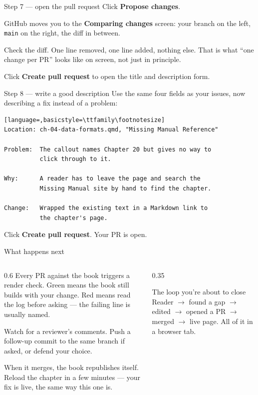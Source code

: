 \documentclass[9pt,aspectratio=169]{beamer}
\begin{document}
\begin{frame}{Step 7 --- open the pull request}
    Click \textbf{Propose changes}.

    \medskip
    GitHub moves you to the \textbf{Comparing changes} screen: your branch on the left, \texttt{main} on the right, the diff in between.

    \medskip
    Check the diff. One line removed, one line added, nothing else. That is what ``one change per PR'' looks like on screen, not just in principle.

    \medskip
    Click \textbf{Create pull request} to open the title and description form.
\end{frame}

\begin{frame}[fragile]{Step 8 --- write a good description}
    Use the same four fields as your issues, now describing a fix instead of a problem:
\begin{lstlisting}[language=,basicstyle=\ttfamily\footnotesize]
Location: ch-04-data-formats.qmd, "Missing Manual Reference"

Problem:  The callout names Chapter 20 but gives no way to
          click through to it.

Why:      A reader has to leave the page and search the
          Missing Manual site by hand to find the chapter.

Change:   Wrapped the existing text in a Markdown link to
          the chapter's page.
\end{lstlisting}
    Click \textbf{Create pull request}. Your PR is open.
\end{frame}

\begin{frame}{What happens next}
    \begin{columns}[T]
        \begin{column}{0.6\textwidth}
            Every PR against the book triggers a render check. Green means the book still builds with your change. Red means read the log before asking --- the failing line is usually named.

            \medskip
            Watch for a reviewer's comments. Push a follow-up commit to the same branch if asked, or defend your choice.

            \medskip
            When it merges, the book republishes itself. Reload the chapter in a few minutes --- your fix is live, the same way this one is.
        \end{column}
        \begin{column}{0.35\textwidth}
            \begin{alertblock}{The loop you're about to close}
                \footnotesize Reader $\rightarrow$ found a gap $\rightarrow$ edited $\rightarrow$ opened a PR $\rightarrow$ merged $\rightarrow$ live page. All of it in a browser tab.
            \end{alertblock}
        \end{column}
    \end{columns}
\end{frame}
\end{document}
